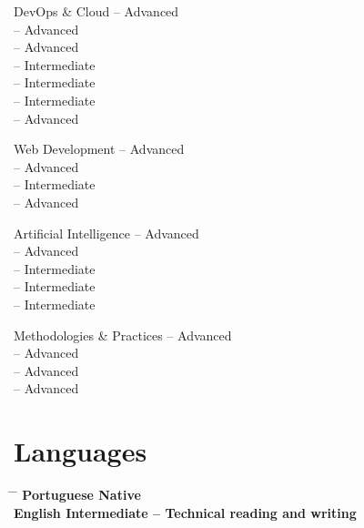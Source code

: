 \documentclass{article}
\begin{document}
\begin{skillgroup}{DevOps \& Cloud}%
   – Advanced \\
   – Advanced \\
   – Advanced \\
   – Intermediate \\
   – Intermediate \\
   – Intermediate \\
   – Advanced
\end{skillgroup}

\begin{skillgroup}{Web Development}%
   – Advanced \\
   – Advanced \\
   – Intermediate \\
   – Advanced
\end{skillgroup}

\begin{skillgroup}{Artificial Intelligence}%
   – Advanced \\
   – Advanced \\
   – Intermediate \\
   – Intermediate \\
   – Intermediate
\end{skillgroup}

\begin{skillgroup}{Methodologies \& Practices}%
   – Advanced \\
   – Advanced \\
   – Advanced \\
   – Advanced \\
\end{skillgroup}

\section*{Languages}

\begin{tabbing}
  \hspace{2cm} \= \hspace{4cm} \= \kill
  \bf{Portuguese} \> Native \\
  \bf{English} \> Intermediate – Technical reading and writing
\end{tabbing}
\end{document}

